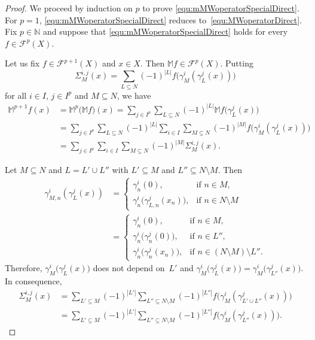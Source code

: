 \documentclass[10pt,a4paper]{amsart}
\begin{document}
\begin{proof}
We proceed by induction on $p$ to prove \eqref{equ:mMWoperatorSpecialDirect}.
For $p=1$, \eqref{equ:mMWoperatorSpecialDirect} reduces to~\eqref{equ:MWoperatorDirect}. Fix $p\in\mathbb N$ and suppose that \eqref{equ:mMWoperatorSpecialDirect} holds for every $f\in \mathcal{F}^p(X)$.

Let us fix $f\in\mathcal{F}^{p+1}(X)$ and $x\in X$. Then $\mathbb{M}f\in\mathcal{F}^p(X)$. Putting 
\begin{equation*}
\Sigma_M^{i,j}(x)=\sum_{L\subseteq N}(-1)^{|L|}f\big(\gamma^i_M(\gamma^j_L(x))\big)
\end{equation*}
for all $i\in I$, $j\in I^p$ and $M\subseteq N$, we have
\begin{equation}\label{equ:MWspecial(p+1)}
\begin{split}
\mathbb{M}^{p+1} f(x)&=\mathbb{M}^p\big(\mathbb{M} f\big)(x)
=\sum_{j\in I^p}\sum_{L\subseteq N}(-1)^{|L|}\mathbb{M}f\big(\gamma^j_L(x)\big)\\
&=\sum_{j\in I^p}\sum_{L\subseteq N}(-1)^{|L|}
\sum_{i\in I}\sum_{M\subseteq N}(-1)^{|M|}f\big(\gamma^i_M(\gamma^j_L(x))\big)\\
&=\sum_{j\in I^p}\sum_{i\in I}\sum_{M\subseteq N}(-1)^{|M|}\Sigma_M^{i,j}(x).
\end{split}
\end{equation}

Let $M\subseteq N$ and $L=L'\cup L''$ with $L'\subseteq M$ and $L''\subseteq N\setminus M$. Then
\begin{equation}\label{equ:gammaKLij}
\begin{split}
\gamma^i_{M,n}(\gamma^j_L(x))
&=\begin{cases}
\gamma^i_n(0),&\text{if }n\in M,\\
\gamma^i_n\big(\gamma^j_{L,n}(x_n)\big),&\text{if }n\in  N\setminus M
\end{cases}\\
&=\begin{cases}
\gamma^i_n(0),&\text{if }n\in M,\\
\gamma^i_n\big(\gamma^j_n(0)\big),&\text{if }n\in L'',\\
\gamma^i_n\big(\gamma^j_n(x_n)\big),&\text{if }n\in (N\setminus M)\setminus L''.
\end{cases}
\end{split}
\end{equation}
Therefore, $\gamma^i_M\big(\gamma^j_L(x)\big)$ does not depend on~$L'$ and
$\gamma^i_M\big(\gamma^j_L(x)\big)=\gamma^i_M\big(\gamma^j_{L''}(x)\big)$.
In consequence, 
\begin{equation}\label{Sigma}
\begin{split}
\Sigma_M^{i,j}(x)&=\sum_{L'\subseteq M}(-1)^{|L'|}\sum_{L''\subseteq N\setminus M}(-1)^{|L''|}
f\big(\gamma^i_M(\gamma^j_{L'\cup L''}(x))\big)\\
&=\sum_{L'\subseteq M}(-1)^{|L'|}\sum_{L''\subseteq N\setminus M}
(-1)^{|L''|}f\big(\gamma^i_M(\gamma^j_{ L''}(x))\big).	
\end{split}		
\end{equation}


\end{proof}
\end{document}
